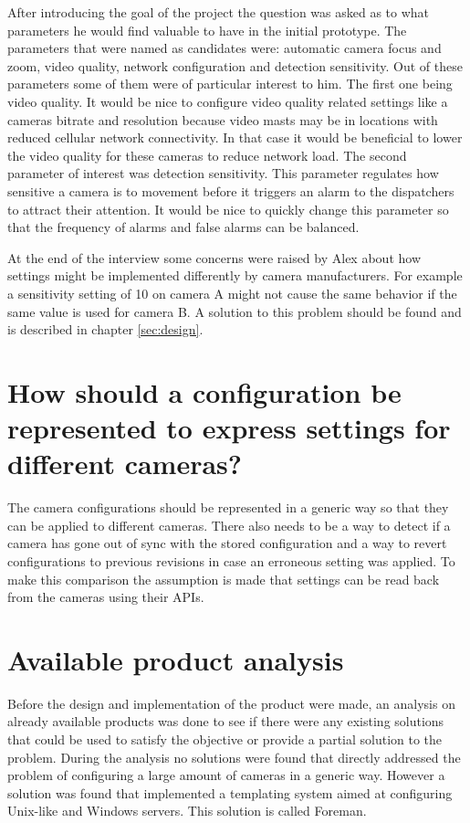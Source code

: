After introducing the goal of the project the question was asked as to what parameters he would find valuable to have in the initial prototype.
The parameters that were named as candidates were: automatic camera focus and zoom, video quality, network configuration and detection sensitivity.
Out of these parameters some of them were of particular interest to him. The first one being video quality. It would be nice to configure video quality related settings like a
cameras bitrate and resolution because video masts may be in locations with reduced cellular network connectivity. In that case it would be beneficial to lower the video quality
for these cameras to reduce network load. The second parameter of interest was detection sensitivity. This parameter regulates how sensitive a camera is to movement before it
triggers an alarm to the dispatchers to attract their attention. It would be nice to quickly change this parameter so that the frequency of alarms and false alarms can be balanced.


At the end of the interview some concerns were raised by Alex about how settings might be implemented differently by camera manufacturers. For example a sensitivity setting of 10
on camera A might not cause the same behavior if the same value is used for camera B. A solution to this problem should be found and is described in chapter \ref{sec:design}.

\section{How should a configuration be represented to express settings for different cameras?}
The camera configurations should be represented in a generic way so that they can be applied to different cameras. There also needs to be a way to detect if a camera
has gone out of sync with the stored configuration and a way to revert configurations to previous revisions in case an erroneous setting was applied. To make this comparison the assumption is made that settings can be read back from the cameras using their APIs.

\section{Available product analysis}
Before the design and implementation of the product were made, an analysis on already available products was done to see if there were any existing solutions that could be used to satisfy the objective or provide a partial solution to the problem.
During the analysis no solutions were found that directly addressed the problem of configuring a large amount of cameras in a generic way.
However a solution was found that implemented a templating system aimed at configuring Unix-like and Windows servers.
This solution is called Foreman.

